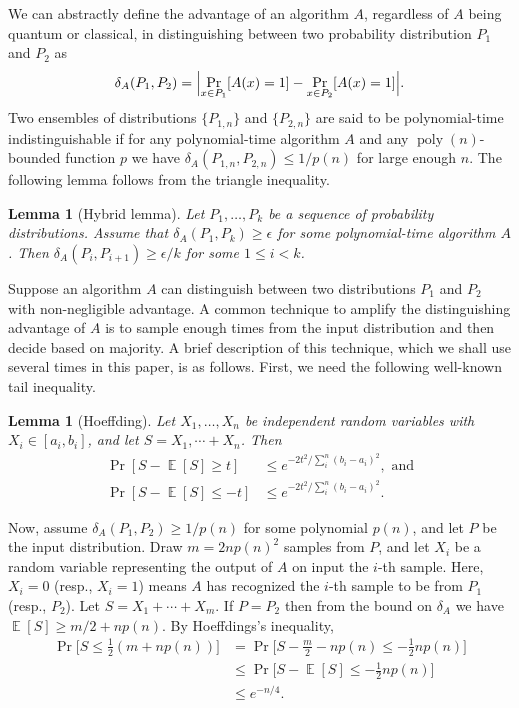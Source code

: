 \documentclass[11pt]{article}
\theoremstyle{plain}
\newtheorem{lemma}[theorem]{Lemma}
\theoremstyle{definition}
\DeclareMathOperator{\poly}{poly}
\DeclareMathOperator{\E}{\mathbb{E}}
\DeclarePairedDelimiter{\abs}{\lvert}{\rvert}
\begin{document}
We can abstractly define the advantage of an algorithm $A$, regardless of $A$ being quantum or classical, in distinguishing between two probability distribution $P_1$ and $P_2$ as
\[ \delta_A(P_1, P_2) = \abs[\Big]{ \Pr_{x \in P_1}[A(x) = 1] - \Pr_{x \in P_2}[A(x) = 1] }. \]
Two ensembles of distributions $\{ P_{1, n} \}$ and $\{ P_{2, n} \}$ are said to be polynomial-time indistinguishable if for any polynomial-time algorithm $A$ and any $\poly(n)$-bounded function $p$ we have $\delta_A(P_{1, n}, P_{2, n}) \le 1 / p(n)$ for large enough $n$. The following lemma follows from the triangle inequality.
\begin{lemma}[Hybrid lemma]
    \label{lem:hybrid}
    Let $P_1, \dots, P_k$ be a sequence of probability distributions. Assume that $\delta_A(P_1, P_k) \ge \epsilon$ for some polynomial-time algorithm $A$. Then $\delta_A(P_i, P_{i + 1}) \ge \epsilon / k$ for some $1 \le i < k$.
\end{lemma}
Suppose an algorithm $A$ can distinguish between two distributions $P_1$ and $P_2$ with non-negligible advantage. A common technique to amplify the distinguishing advantage of $A$ is to sample enough times from the input distribution and then decide based on majority. A brief description of this technique, which we shall use several times in this paper, is as follows. First, we need the following well-known tail inequality.
\begin{lemma}[Hoeffding]
    \label{lem:hoeffding}
    Let $X_1, \dots, X_n$ be independent random variables with $X_i \in [a_i, b_i]$, and let $S = X_1, \cdots + X_n$. Then
    \begin{align*}
        \Pr[S - \E[S] \ge t] & \le e^{-2t^2 / \sum_i^n (b_i - a_i)^2}, \text{ and} \\
        \Pr[S - \E[S] \le -t] & \le e^{-2t^2 / \sum_i^n (b_i - a_i)^2}.
    \end{align*}
\end{lemma}
Now, assume $\delta_A(P_1, P_2) \ge 1 / p(n)$ for some polynomial $p(n)$, and let $P$ be the input distribution. Draw $m = 2np(n)^2$ samples from $P$, and let $X_i$ be a random variable representing the output of $A$ on input the $i$-th sample. Here, $X_i = 0$ (resp., $X_i = 1$) means $A$ has recognized the $i$-th sample to be from $P_1$ (resp., $P_2$). Let $S = X_1 + \cdots + X_m$. If $P = P_2$ then from the bound on $\delta_A$ we have $\E[S] \ge m / 2 + np(n)$. By Hoeffdings's inequality,
\begin{align*}
    \Pr\Big[ S \le \frac{1}{2} (m + np(n)) \Big]
    & = \Pr\Big[ S - \frac{m}{2} - np(n) \le -\frac{1}{2}np(n) \Big] \\
    & \le \Pr\Big[ S - \E[S] \le -\frac{1}{2}np(n) \Big] \\
    & \le e^{-n / 4}.
\end{align*}
\end{document}
